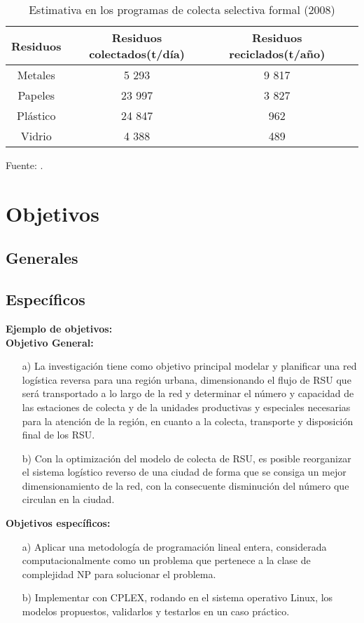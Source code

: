 \begin{table}[h!]
\centering
\caption{Estimativa en los programas de colecta selectiva formal (2008)}
\begin{tabular}{|c|c|c|c|}  \hline 
Residuos & Residuos colectados(t/día) & Residuos reciclados(t/año) \\ \hline 
Metales & 5 293 & 9 817 \\
Papeles & 23 997 & 3 827 \\ 
Plástico & 24 847 & 962 \\
Vidrio & 4 388 & 489  \\\hline
\end{tabular}
\begin{center}
{\small{Fuente: \cite{MMA}.}}
\end{center}
\end{table}

\section{Objetivos}
\subsection{Generales}
\subsection{Específicos}

{\bf Ejemplo de objetivos:}\\
{\bf Objetivo General:}
\begin{enumerate}
\item[a)] La investigación tiene como objetivo principal modelar y planificar una red logística reversa para una región urbana, dimensionando el flujo de RSU que será transportado a lo largo de la red y determinar el número y capacidad de las estaciones de colecta y de la unidades productivas y especiales necesarias para la atención de la región, en cuanto a la colecta, transporte y disposición final de los RSU.
\vskip 0.3cm
\item[b)]Con la optimización del modelo de colecta de RSU, es posible reorganizar el sistema logístico reverso de una ciudad de forma que se consiga un mejor dimensionamiento de la red, con la consecuente disminución del número que circulan en la ciudad.
\end{enumerate}
\vskip 0.2cm
{\bf Objetivos específicos:}
\begin{enumerate}
\item[a)] Aplicar una metodología de programación lineal entera, considerada computacionalmente como un problema que pertenece a la clase de complejidad NP \citep{Korte} para solucionar el problema.
\item[b)] Implementar con CPLEX, rodando en el sistema operativo Linux, los modelos propuestos, validarlos y testarlos en un caso práctico.
\end{enumerate}

